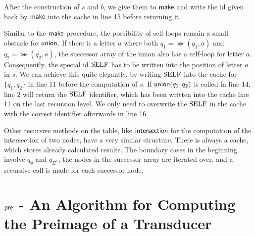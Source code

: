 \par 

After the construction of $s$ and $b$, we give them to $\operatorname{\textsf{make}}$ and write the id given back by $\operatorname{\textsf{make}}$ into the cache in line 15 before returning it.

\par

Similar to the $\operatorname{\textsf{make}}$ procedure, the possibility of self-loops remain a small obstacle for $\operatorname{\textsf{union}}$. If there is a letter $a$ where both $q_{1} = \Succ(q_{1},a)$ and $q_{2} = \Succ(q_{2},a)$, the successor array of the union also has a self-loop for letter $a$. Consequently, the special id $\mathrm{SELF}$ has to be written into the position of letter $a$ in $s$. We can achieve this quite elegantly, by writing $\mathrm{SELF}$ into the cache for $\{q_{1},q_{2}\}$ in line 11 before the computation of $s$. If $\operatorname{\textsf{union}}(q_{1},q_{2})$ is called in line 14, line 2 will return the $\mathrm{SELF}$ identifier, which has been written into the cache line 11 on the last recursion level. We only need to overwrite the $\mathrm{SELF}$ in the cache with the correct identifier afterwards in line 16.
\par
Other recursive methods on the table, like $\operatorname{\textsf{intersection}}$ for the computation of the intersection of two nodes, have a very similar structure. There is always a cache, which stores already calculated results. The boundary cases in the beginning involve $q_{\emptyset}$ and $q_{\Sigma^{*}}$, the nodes in the successor array are iterated over, and a recursive call is made for each successor node. 


\section{$\operatorname{\textsf{pre}}$ - An Algorithm for Computing the Preimage of a Transducer}\label{sec:pre}

